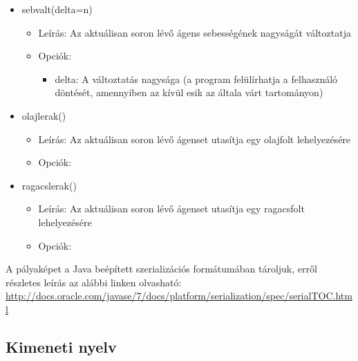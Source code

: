 \begin{itemize}
    \item sebvalt(delta=n)
    \begin{itemize}
        \item Leírás: Az aktuálisan soron lévő ágens sebességének nagyságát változtatja
        \item Opciók: 
            \begin{itemize}
                \item delta: A változtatás nagysága (a program felülírhatja a felhasználó döntését, amennyiben az kívül esik az általa várt tartományon) 
            \end{itemize}
    \end{itemize}

    \item olajlerak()
    \begin{itemize}
        \item Leírás: Az aktuálisan soron lévő ágenset utasítja egy olajfolt lehelyezésére
        \item Opciók: 
    \end{itemize}

    \item ragacslerak()
    \begin{itemize}
        \item Leírás: Az aktuálisan soron lévő ágenset utasítja egy ragacsfolt lehelyezésére
        \item Opciók: 
    \end{itemize}

\end{itemize}

\noindent A pályaképet a Java beépített szerializációs formátumában tároljuk, erről részletes leírás az alábbi linken olvasható:\\
\url{http://docs.oracle.com/javase/7/docs/platform/serialization/spec/serialTOC.html}

\subsection{Kimeneti nyelv}

